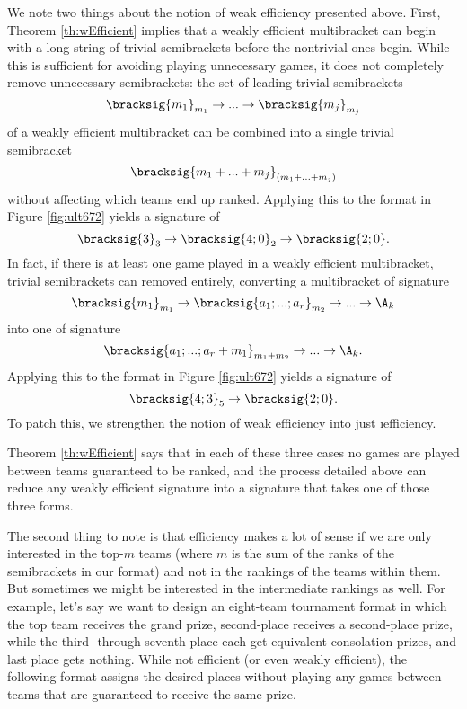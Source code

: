 {    

    We note two things about the notion of weak efficiency presented above. First, Theorem \ref{th:wEfficient} implies that a weakly efficient multibracket can begin with a long string of trivial semibrackets before the nontrivial ones begin. While this is sufficient for avoiding playing unnecessary games, it does not completely remove unnecessary semibrackets: the set of leading trivial semibrackets $$\bracksig{m_1}_{m_1} \to ... \to \bracksig{m_{j}}_{m_{j}}$$ of a weakly efficient multibracket can be combined into a single trivial semibracket $$\bracksig{m_1 + ... + m_{j}}_{(m_1 + ... + m_{j})}$$ without affecting which teams end up ranked. Applying this to the format in Figure \ref{fig:ult672} yields a signature of $$\bracksig{3}_3 \to \bracksig{4;0}_2 \to \bracksig{2;0}.$$ 
    In fact, if there is at least one game played in a weakly efficient multibracket, trivial semibrackets can removed entirely, converting a multibracket of signature $$\bracksig{m_1}_{m_1} \to \bracksig{a_1; ...; a_r}_{m_2} \to ... \to \A_k$$ into one of signature $$\bracksig{a_1; ...; a_r + m_1}_{m_1 + m_2} \to ... \to \A_k.$$ 
    Applying this to the format in Figure \ref{fig:ult672} yields a signature of $$\bracksig{4;3}_5 \to \bracksig{2;0}.$$
    To patch this, we strengthen the notion of weak efficiency into just \i{efficiency.}


    Theorem \ref{th:wEfficient} says that in each of these three cases no games are played between teams guaranteed to be ranked, and the process detailed above can reduce any weakly efficient signature into a signature that takes one of those three forms.

    The second thing to note is that efficiency makes a lot of sense if we are only interested in the top-$m$ teams (where $m$ is the sum of the ranks of the semibrackets in our format) and not in the rankings of the teams within them. But sometimes we might be interested in the intermediate rankings as well. For example, let's say we want to design an eight-team tournament format in which the top team receives the grand prize, second-place receives a second-place prize, while the third- through seventh-place each get equivalent consolation prizes, and last place gets nothing. While not efficient (or even weakly efficient), the following format assigns the desired places without playing any games between teams that are guaranteed to receive the same prize.

}
